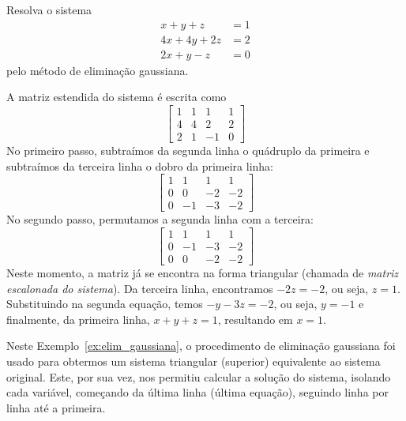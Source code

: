 \documentclass[
	12pt,				%
	oneside,			%
	a4paper,			%
	english,			%
	french,				%
	spanish,			%
	brazil				%
	]{abntex2}
\begin{document}
\begin{ex}\label{ex:elim_gaussiana} Resolva o sistema
  \begin{equation}
    \begin{split}
      x+y+z  &= 1\\
      4x+4y+2z&= 2\\
      2x+y-z &= 0
    \end{split}
  \end{equation}
pelo método de eliminação gaussiana.
\end{ex}
\begin{sol}
A matriz estendida do sistema é escrita como
\begin{equation}
  \begin{bmatrix}
      1 &1& 1&1\\
      4 & 4 &2&2\\
      2 &1& -1&0
  \end{bmatrix}
\end{equation}
No primeiro passo, subtraímos da segunda linha o quádruplo da primeira e subtraímos da terceira linha o dobro da primeira linha:
\begin{equation}
  \begin{bmatrix}
       1 &1& 1&1\\
       0 & 0 &-2&-2\\
       0 &-1& -3&-2
  \end{bmatrix}
\end{equation}
No segundo passo, permutamos a segunda linha com a terceira:
\begin{equation}
  \begin{bmatrix}
       1 &1& 1&1\\
       0 &-1& -3&-2\\
       0 & 0 &-2&-2
  \end{bmatrix}
\end{equation}
Neste momento, a matriz já se encontra na forma triangular (chamada de \emph{matriz escalonada do sistema}). Da terceira linha, encontramos $-2z=-2$, ou seja, $z=1$. Substituindo na segunda equação, temos $-y-3z=-2$, ou seja, $y=-1$ e finalmente, da primeira linha, $x+y+z=1$, resultando em $x=1$.
\end{sol}

Neste Exemplo~\ref{ex:elim_gaussiana}, o procedimento de eliminação gaussiana foi usado para obtermos um sistema triangular (superior) equivalente ao sistema original. Este, por sua vez, nos permitiu calcular a solução do sistema, isolando cada variável, começando da última linha (última equação), seguindo linha por linha até a primeira.
\end{document}
